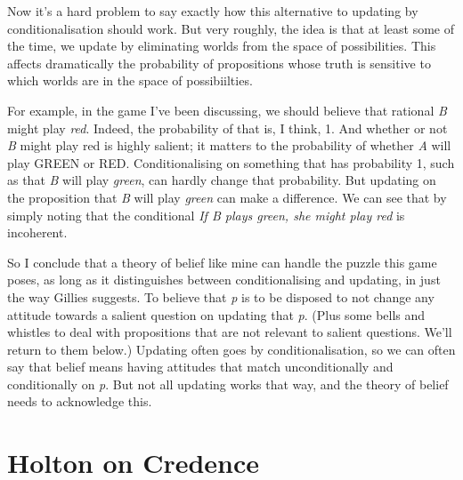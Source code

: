 \documentclass[
  11pt,
  letterpaper,
  DIV=11,
  numbers=noendperiod,
  twoside]{scrartcl}
\begin{document}
Now it's a hard problem to say exactly how this alternative to updating
by conditionalisation should work. But very roughly, the idea is that at
least some of the time, we update by eliminating worlds from the space
of possibilities. This affects dramatically the probability of
propositions whose truth is sensitive to which worlds are in the space
of possibiilties.

For example, in the game I've been discussing, we should believe that
rational \emph{B} might play \emph{red}. Indeed, the probability of that
is, I think, 1. And whether or not \emph{B} might play red is highly
salient; it matters to the probability of whether \emph{A} will play
GREEN or RED. Conditionalising on something that has probability 1, such
as that \emph{B} will play \emph{green}, can hardly change that
probability. But updating on the proposition that \emph{B} will play
\emph{green} can make a difference. We can see that by simply noting
that the conditional \emph{If B plays green, she might play red} is
incoherent.

So I conclude that a theory of belief like mine can handle the puzzle
this game poses, as long as it distinguishes between conditionalising
and updating, in just the way Gillies suggests. To believe that \emph{p}
is to be disposed to not change any attitude towards a salient question
on updating that \emph{p}. (Plus some bells and whistles to deal with
propositions that are not relevant to salient questions. We'll return to
them below.) Updating often goes by conditionalisation, so we can often
say that belief means having attitudes that match unconditionally and
conditionally on \emph{p}. But not all updating works that way, and the
theory of belief needs to acknowledge this.

\section{Holton on Credence}\label{holton-on-credence}
\end{document}
